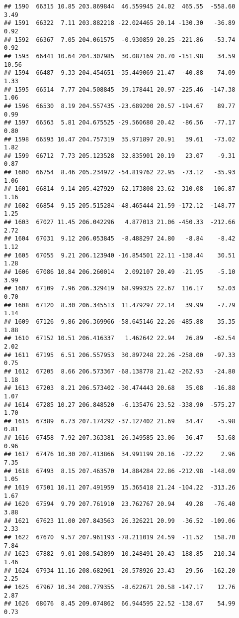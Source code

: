 \documentclass[]{article}
\begin{document}
\begin{verbatim}
## 1590  66315 10.85 203.869844  46.559945 24.02  465.55  -558.60  3.49
## 1591  66322  7.11 203.882218 -22.024465 20.14 -130.30   -36.89  0.92
## 1592  66367  7.05 204.061575  -0.930859 20.25 -221.86   -53.74  0.92
## 1593  66441 10.64 204.307985  30.087169 20.70 -151.98    34.59 10.56
## 1594  66487  9.33 204.454651 -35.449069 21.47  -40.88    74.09  1.33
## 1595  66514  7.77 204.508845  39.178441 20.97 -225.46  -147.38  1.06
## 1596  66530  8.19 204.557435 -23.689200 20.57 -194.67    89.77  0.99
## 1597  66563  5.81 204.675525 -29.560680 20.42  -86.56   -77.17  0.80
## 1598  66593 10.47 204.757319  35.971897 20.91   39.61   -73.02  1.82
## 1599  66712  7.73 205.123528  32.835901 20.19   23.07    -9.31  0.87
## 1600  66754  8.46 205.234972 -54.819762 22.95  -73.12   -35.93  1.06
## 1601  66814  9.14 205.427929 -62.173808 23.62 -310.08  -106.87  1.16
## 1602  66854  9.15 205.515284 -48.465444 21.59 -172.12  -148.77  1.25
## 1603  67027 11.45 206.042296   4.877013 21.06 -450.33  -212.66  2.72
## 1604  67031  9.12 206.053845  -8.488297 24.80   -8.84    -8.42  1.12
## 1605  67055  9.21 206.123940 -16.854501 22.11 -138.44    30.51  1.28
## 1606  67086 10.84 206.260014   2.092107 20.49  -21.95    -5.10  3.99
## 1607  67109  7.96 206.329419  68.999325 22.67  116.17    52.03  0.70
## 1608  67120  8.30 206.345513  11.479297 22.14   39.99    -7.79  1.14
## 1609  67126  9.86 206.369966 -58.645146 22.26 -485.88    35.35  1.88
## 1610  67152 10.51 206.416337   1.462642 22.94   26.89   -62.54  2.02
## 1611  67195  6.51 206.557953  30.897248 22.26 -258.00   -97.33  0.75
## 1612  67205  8.66 206.573367 -68.138778 21.42 -262.93   -24.80  1.18
## 1613  67203  8.21 206.573402 -30.474443 20.68   35.08   -16.88  1.07
## 1614  67285 10.27 206.848520  -6.135476 23.52 -338.90  -575.27  1.70
## 1615  67389  6.73 207.174292 -37.127402 21.69   34.47    -5.98  0.81
## 1616  67458  7.92 207.363381 -26.349585 23.06  -36.47   -53.68  0.96
## 1617  67476 10.30 207.413866  34.991199 20.16  -22.22     2.96  7.35
## 1618  67493  8.15 207.463570  14.884284 22.86 -212.98  -148.09  1.05
## 1619  67501 10.11 207.491959  15.365418 21.24 -104.22  -313.26  1.67
## 1620  67594  9.79 207.761910  23.762767 20.94   49.28   -76.40  3.88
## 1621  67623 11.00 207.843563  26.326221 20.99  -36.52  -109.06  2.33
## 1622  67670  9.57 207.961193 -78.211019 24.59  -11.52   158.70  7.84
## 1623  67882  9.01 208.543899  10.248491 20.43  188.85  -210.34  1.46
## 1624  67934 11.16 208.682961 -20.578926 23.43   29.56  -162.20  2.25
## 1625  67967 10.34 208.779355  -8.622671 20.58 -147.17    12.76  2.87
## 1626  68076  8.45 209.074862  66.944595 22.52 -138.67    54.99  0.73

\end{verbatim}
\end{document}
